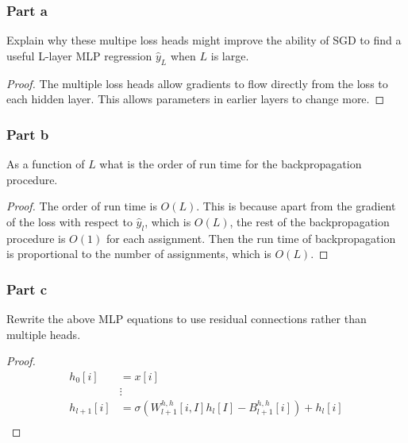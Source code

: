 \documentclass{amsart}
\theoremstyle{definition}
\begin{document}
\subsubsection*{Part a} Explain why these multipe loss heads might improve the ability of SGD to find a useful L-layer MLP regression $\hat{y}_L$ when $L$ is large. 
\begin{proof}
  The multiple loss heads allow gradients to flow directly from the loss to each hidden layer. 
  This allows parameters in earlier layers to change more. 
\end{proof}
\subsubsection*{Part b} As a function of $L$ what is the order of run time for the backpropagation procedure. 
\begin{proof}
  The order of run time is $O(L)$. This is because apart from the gradient of the loss with respect to $\hat{y}_l$, which is $O(L)$, 
  the rest of the backpropagation procedure is $O(1)$ for each assignment. 
  Then the run time of backpropagation is proportional to the number of assignments, which is $O(L)$.
\end{proof}

\subsubsection*{Part c} Rewrite the above MLP equations to use residual connections rather than multiple heads.
\begin{proof}
  \begin{align*}
    h_0[i] &= x[i]\\
    &\vdots \\
    h_{l + 1}[i] &= \sigma(W_{l + 1}^{h, h}[i, I] h_{l}[I] - B_{l + 1}^{h,h}[i]) + h_l[i]\\
  \end{align*}
\end{proof}
\end{document}

